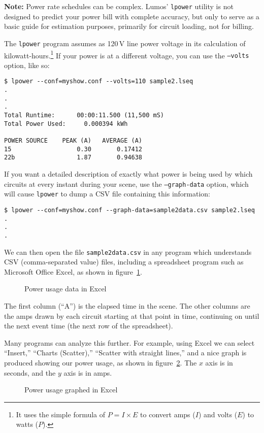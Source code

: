 \documentclass{article}
\begin{document}
{\bf Note:} Power rate schedules can be complex.  Lumos' {\tt lpower} utility is
not designed to predict your power bill with complete accuracy, but only to serve
as a basic guide for estimation purposes, primarily for circuit loading, not for
billing.

The {\tt lpower} program assumes as 120\,V line power voltage in its calculation
of kilowatt-hours.\footnote{It uses the simple formula of $P=I\times E$ to convert
amps ($I$) and volts ($E$) to watts ($P$).}  If your power is at a different voltage,
you can use the {\tt --volts} option, like so:

\begin{verbatim}
$ lpower --conf=myshow.conf --volts=110 sample2.lseq
.
.
.
Total Runtime:      00:00:11.500 (11,500 mS)
Total Power Used:     0.000394 kWh

POWER SOURCE    PEAK (A)   AVERAGE (A)
15                  0.30       0.17412
22b                 1.87       0.94638
\end{verbatim}

If you want a detailed description of exactly what power is being used by which
circuits at every instant during your scene, use the {\tt --graph-data} option, 
which will cause {\tt lpower} to dump a CSV file containing this information:

\begin{verbatim}
$ lpower --conf=myshow.conf --graph-data=sample2data.csv sample2.lseq
.
.
.
\end{verbatim}

We can then open the file {\tt sample2data.csv} in any program which understands
CSV (comma-separated value) files, including a spreadsheet program such as Microsoft
Office Excel, as shown in figure~\ref{csvexcel}.
\begin{figure}[htbp]
\caption{Power usage data in Excel\label{csvexcel}}
\end{figure}

The first column (``A'') is the elapsed time in the scene.  The other columns
are the amps drawn by each circuit starting at that point in time, continuing
on until the next event time (the next row of the spreadsheet).

Many programs can analyze this further.  For example, using Excel we can 
select ``Insert,'' ``Charts (Scatter),'' ``Scatter with straight lines,''
and a nice graph is produced showing our power usage, as shown in figure~\ref{csvgraph}.
The $x$ axis is in seconds, and the $y$ axis is in amps.
\begin{figure}[htbp]
\caption{Power usage graphed in Excel\label{csvgraph}}
\end{figure}
\end{document}
